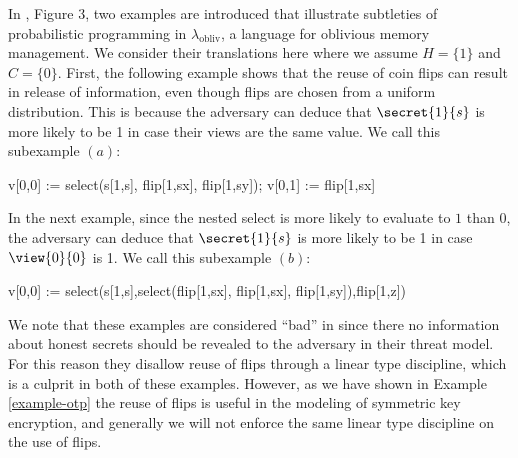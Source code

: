 \begin{example}
  \label{example-lambda-obliv}
  In \cite{darais2019language}, Figure 3, two examples are introduced that illustrate
  subtleties of probabilistic programming in
  $\lambda_{\mathrm{obliv}}$, a language for oblivious memory
  management. We consider their translations here where we
  assume $H = \{ 1 \}$ and $C = \{ 0 \}$. First, the following
  example shows that the reuse of coin flips can result in release of
  information, even though flips are chosen from a uniform
  distribution. This is because the adversary can deduce that
  $\secret{1}{s}$ is more likely to be 1 in case their views are the
  same value. We call this subexample $(a)$:
  \begin{verbatimtab}
    v[0,0] := select(s[1,s], flip[1,sx], flip[1,sy]);
    v[0,1] := flip[1,sx] \end{verbatimtab}
  In the next example, since the nested select is more likely to evaluate
  to $1$ than $0$, the adversary can deduce that $\secret{1}{s}$ is
  more likely to be 1 in case $\view{0}{0}$ is 1. We call this subexample $(b)$:
  \begin{verbatimtab}
  v[0,0] := select(s[1,s],select(flip[1,sx], flip[1,sx], flip[1,sy]),flip[1,z]) \end{verbatimtab}
  We note that these examples are considered ``bad'' in \cite{darais2019language} since there
  no information about honest secrets should be revealed to the adversary in
  their threat model. For this reason they disallow reuse of flips through a
  linear type discipline, which is a culprit in both of these examples. However,
  as we have shown in Example \ref{example-otp} the reuse of flips is useful in
  the modeling of symmetric key encryption, and generally we will not enforce
  the same linear type discipline on the use of flips.
\end{example}

